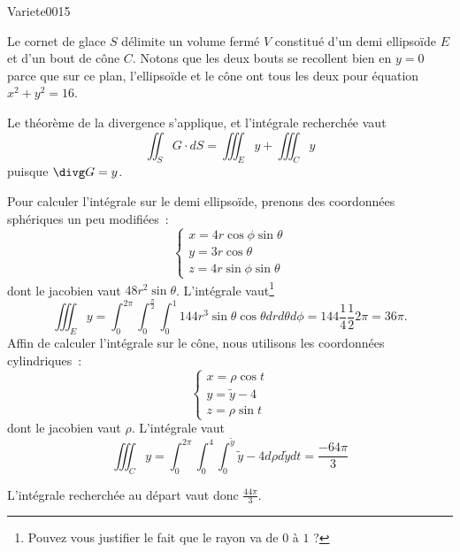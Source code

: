 
\begin{corrige}{Variete0015}

Le cornet de glace $S$ délimite un volume fermé $V$ constitué d'un demi ellipsoïde $E$ et d'un bout de cône $C$. Notons que les deux bouts se recollent bien en $y=0$ parce que sur ce plan, l'ellipsoïde et le cône ont tous les deux pour équation  $x^2+y^2=16$.

Le théorème de la divergence s'applique, et l'intégrale recherchée vaut
\begin{equation*}
  \iint_S G \cdot d S = \iiint_E y + \iiint_C y
\end{equation*}
puisque $\divg G = y$.

Pour calculer l'intégrale sur le demi ellipsoïde, prenons des coordonnées sphériques un peu modifiées~:
\begin{equation*}
  \begin{cases}
    x = 4 r \cos \phi \sin \theta\\
    y = 3 r \cos \theta\\
    z = 4 r \sin \phi \sin \theta
  \end{cases}
\end{equation*}
dont le jacobien vaut $48 r^2 \sin \theta$. L'intégrale vaut\footnote{Pouvez vous justifier le fait que le rayon va de $0$ à $1$ ?}
\begin{equation*}
  \iiint_E y = %
  \int_0^{2\pi} \int_0^{\frac\pi2} \int_0^1 144 r^3 \sin\theta\cos\theta%
  d r d \theta d \phi =%
  144 \frac 14 \frac 12 2 \pi = 36 \pi.
\end{equation*}
Affin de calculer l'intégrale sur le cône, nous utilisons les coordonnées cylindriques~:
\begin{equation*}
  \begin{cases}
    x = \rho \cos t\\
    y = \tilde y - 4\\
    z = \rho \sin t
  \end{cases}
\end{equation*}
dont le jacobien vaut $\rho$. L'intégrale vaut
\begin{equation*}
  \iiint_C y = \int_0^{2\pi} \int_0^4 \int_0^{\tilde y} \tilde y - 4
  d\rho d\tilde yd t = \frac{- 64 \pi}{3}
\end{equation*}

L'intégrale recherchée au départ vaut donc \begin{math}
  \frac {44 \pi}3
\end{math}.

\end{corrige}
